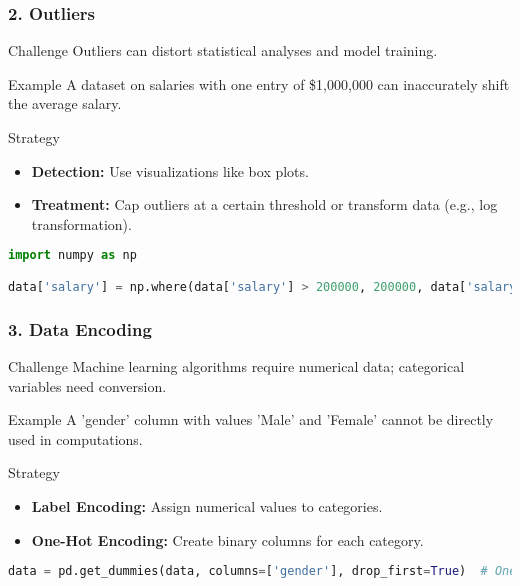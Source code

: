 \documentclass{beamer}
\begin{document}
\begin{frame}[fragile]
    \frametitle{2. Outliers}
    \begin{block}{Challenge}
        Outliers can distort statistical analyses and model training.
    \end{block}
    
    \begin{block}{Example}
        A dataset on salaries with one entry of \$1,000,000 can inaccurately shift the average salary.
    \end{block}

    \begin{block}{Strategy}
        \begin{itemize}
            \item \textbf{Detection:} Use visualizations like box plots.
            \item \textbf{Treatment:} Cap outliers at a certain threshold or transform data (e.g., log transformation).
        \end{itemize}
    \end{block}
    
    \begin{lstlisting}[language=Python]
import numpy as np

data['salary'] = np.where(data['salary'] > 200000, 200000, data['salary'])  # Capping outliers
    \end{lstlisting}
\end{frame}

\begin{frame}[fragile]
    \frametitle{3. Data Encoding}
    \begin{block}{Challenge}
        Machine learning algorithms require numerical data; categorical variables need conversion.
    \end{block}
    
    \begin{block}{Example}
        A 'gender' column with values 'Male' and 'Female' cannot be directly used in computations.
    \end{block}

    \begin{block}{Strategy}
        \begin{itemize}
            \item \textbf{Label Encoding:} Assign numerical values to categories.
            \item \textbf{One-Hot Encoding:} Create binary columns for each category.
        \end{itemize}
    \end{block}
    
    \begin{lstlisting}[language=Python]
data = pd.get_dummies(data, columns=['gender'], drop_first=True)  # One-Hot Encoding
    \end{lstlisting}
\end{frame}
\end{document}
